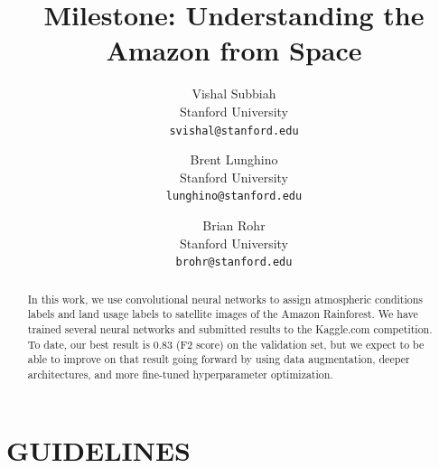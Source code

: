 \documentclass[10pt,twocolumn,letterpaper]{article}
\begin{document}
\title{Milestone: Understanding the Amazon from Space}

\author{Vishal Subbiah\\
Stanford University\\
{\tt\small svishal@stanford.edu}
\and
Brent Lunghino\\
Stanford University\\
{\tt\small lunghino@stanford.edu}
\and
Brian Rohr\\
Stanford University\\
{\tt\small brohr@stanford.edu}
}

\maketitle

\begin{abstract}
   In this work, we use convolutional neural networks to assign atmospheric conditions labels and land usage labels to satellite images of the Amazon Rainforest. We have trained several neural networks and submitted results to the Kaggle.com competition. To date, our best result is 0.83 (F2 score) on the validation set, but we expect to be able to improve on that result going forward by using data augmentation, deeper architectures, and more fine-tuned hyperparameter optimization.
\end{abstract}


\iffalse
\section{GUIDELINES}
\end{document}
